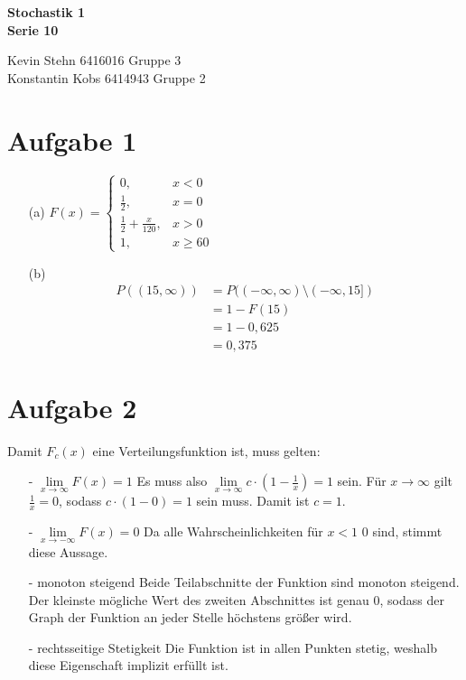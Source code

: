 \documentclass[10pt,a4paper]{article}
\begin{document}
\begin{center}
\textbf{Stochastik 1 \\ Serie 10 \\}
\end{center}

\begin{flushright}
Kevin Stehn 6416016 Gruppe 3 \\
Konstantin Kobs 6414943 Gruppe 2
\end{flushright}

\section*{Aufgabe 1}
\begin{itemize}
\item[(a)]
$ F(x)=\left\{\begin{array}{cl} 0, & x < 0\\ 
\frac{1}{2}, & x = 0 \\ 
\frac{1}{2}+\frac{x}{120}, & x > 0 \\
1 , & x \geq 60 \end{array}\right.$
\item[(b)]
\begin{align*}
P((15, \infty)) &= P((-\infty,\infty) \setminus (-\infty,15]) \\
&= 1 - F(15)\\
&= 1 - 0,625\\
&= 0,375
\end{align*}
\end{itemize}

\section*{Aufgabe 2}
Damit $F_c(x)$ eine Verteilungsfunktion ist, muss gelten:
\begin{itemize}
\item[-]$\lim\limits_{x \rightarrow \infty }{F(x)} = 1$ \qquad Es muss also $\lim\limits_{x \rightarrow \infty }{c \cdot (1-\frac{1}{x})} = 1$ sein. Für $x \rightarrow \infty$ gilt $\frac{1}{x}=0$, sodass $c \cdot (1-0) = 1$ sein muss. Damit ist $c=1$.
\item[-]$\lim\limits_{x \rightarrow -\infty }{F(x)} = 0$ \qquad Da alle Wahrscheinlichkeiten für $x < 1$ $0$ sind, stimmt diese Aussage.
\item[-]monoton steigend \qquad Beide Teilabschnitte der Funktion sind monoton steigend. Der kleinste mögliche Wert des zweiten Abschnittes ist genau $0$, sodass der Graph der Funktion an jeder Stelle höchstens größer wird.
\item[-]rechtsseitige Stetigkeit \qquad Die Funktion ist in allen Punkten stetig, weshalb diese Eigenschaft implizit erfüllt ist.
\end{itemize}
\end{document}
